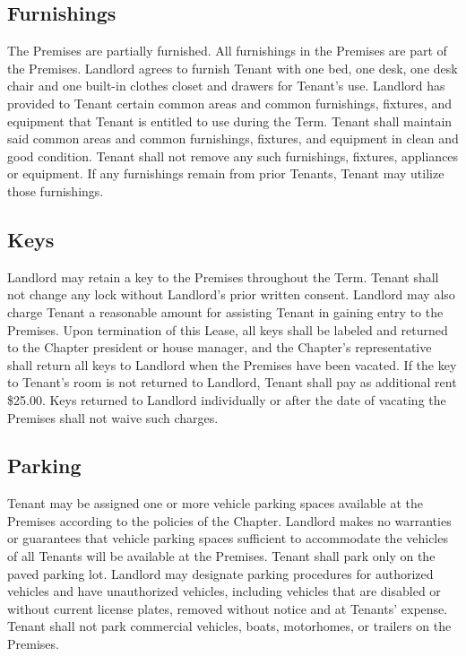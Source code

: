 \documentclass{article}
\begin{document}
\subsection{Furnishings}
The Premises are partially furnished. All furnishings in the Premises are part
of the Premises. Landlord agrees to furnish Tenant with one bed, one desk, one
desk chair and one built-in clothes closet and drawers for Tenant’s use.
Landlord has provided to Tenant certain common areas and common furnishings,
fixtures, and equipment that Tenant is entitled to use during the Term. Tenant
shall maintain said common areas and common furnishings, fixtures, and equipment
in clean and good condition. Tenant shall not remove any such furnishings,
fixtures, appliances or equipment. If any furnishings remain from prior Tenants,
Tenant may utilize those furnishings.

\subsection{Keys}
Landlord may retain a key to the Premises throughout the Term. Tenant shall not
change any lock without Landlord’s prior written consent. Landlord may also
charge Tenant a reasonable amount for assisting Tenant in gaining entry to the
Premises. Upon termination of this Lease, all keys shall be labeled and returned
to the Chapter president or house manager, and the Chapter’s representative
shall return all keys to Landlord when the Premises have been vacated. If the
key to Tenant’s room is not returned to Landlord, Tenant shall pay as additional
rent \$25.00. Keys returned to Landlord individually or after the date of
vacating the Premises shall not waive such charges.

\subsection{Parking}
Tenant may be assigned one or more vehicle parking spaces available at the
Premises according to the policies of the Chapter. Landlord makes no warranties
or guarantees that vehicle parking spaces sufficient to accommodate the vehicles
of all Tenants will be available at the Premises. Tenant shall park only on the
paved parking lot. Landlord may designate parking procedures for authorized
vehicles and have unauthorized vehicles, including vehicles that are disabled or
without current license plates, removed without notice and at Tenants’ expense.
Tenant shall not park commercial vehicles, boats, motorhomes, or trailers on the
Premises.
\end{document}
